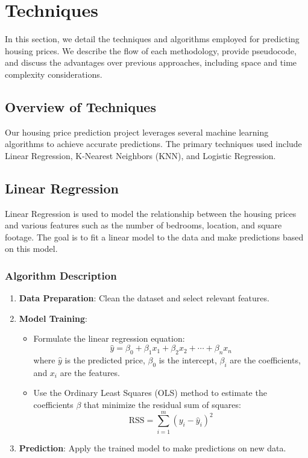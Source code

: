 \documentclass[10pt,conference,compsoc]{IEEEtran}
\begin{document}
{\section{Techniques}

In this section, we detail the techniques and algorithms employed for predicting housing prices. We describe the flow of each methodology, provide pseudocode, and discuss the advantages over previous approaches, including space and time complexity considerations.

\subsection{Overview of Techniques}

Our housing price prediction project leverages several machine learning algorithms to achieve accurate predictions. The primary techniques used include Linear Regression, K-Nearest Neighbors (KNN), and Logistic Regression.

\subsection{Linear Regression}

Linear Regression is used to model the relationship between the housing prices and various features such as the number of bedrooms, location, and square footage. The goal is to fit a linear model to the data and make predictions based on this model.

\subsubsection{Algorithm Description}

\begin{enumerate}
    \item \textbf{Data Preparation}: Clean the dataset and select relevant features.
    \item \textbf{Model Training}:
    \begin{itemize}
        \item Formulate the linear regression equation:
        \[
        \hat{y} = \beta_0 + \beta_1 x_1 + \beta_2 x_2 + \cdots + \beta_n x_n
        \]
        where \( \hat{y} \) is the predicted price, \( \beta_0 \) is the intercept, \( \beta_i \) are the coefficients, and \( x_i \) are the features.
        \item Use the Ordinary Least Squares (OLS) method to estimate the coefficients \( \beta \) that minimize the residual sum of squares:
        \[
        \text{RSS} = \sum_{i=1}^m (y_i - \hat{y}_i)^2
        \]
    \end{itemize}
    \item \textbf{Prediction}: Apply the trained model to make predictions on new data.
\end{enumerate}

}
\end{document}
